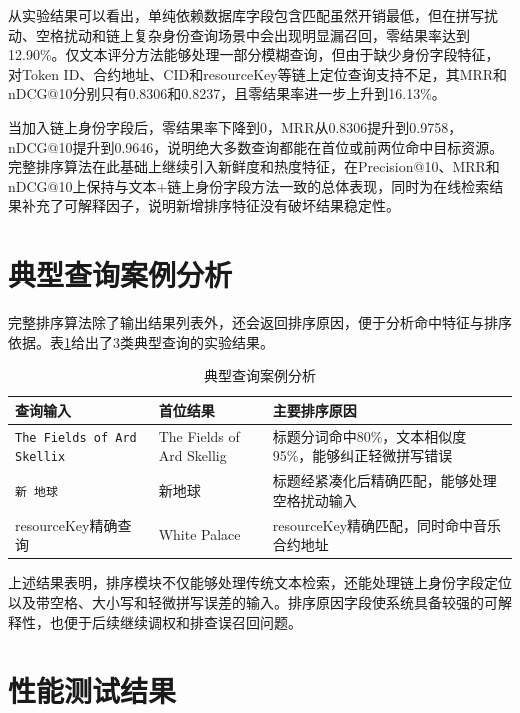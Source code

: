从实验结果可以看出，单纯依赖数据库字段包含匹配虽然开销最低，但在拼写扰动、空格扰动和链上复杂身份查询场景中会出现明显漏召回，零结果率达到12.90\%。仅文本评分方法能够处理一部分模糊查询，但由于缺少身份字段特征，对Token ID、合约地址、CID和resourceKey等链上定位查询支持不足，其MRR和nDCG@10分别只有0.8306和0.8237，且零结果率进一步上升到16.13\%。

当加入链上身份字段后，零结果率下降到0，MRR从0.8306提升到0.9758，nDCG@10提升到0.9646，说明绝大多数查询都能在首位或前两位命中目标资源。完整排序算法在此基础上继续引入新鲜度和热度特征，在Precision@10、MRR和nDCG@10上保持与文本+链上身份字段方法一致的总体表现，同时为在线检索结果补充了可解释因子，说明新增排序特征没有破坏结果稳定性。


\section{典型查询案例分析}

完整排序算法除了输出结果列表外，还会返回排序原因，便于分析命中特征与排序依据。表\ref{tab:ranking_case_analysis}给出了3类典型查询的实验结果。

\begin{table}[htbp]
    \linespread{1.45}
    \songti
    \centering
    \caption{典型查询案例分析}\label{tab:ranking_case_analysis}
    \begin{tabular}{|p{3.6cm}|p{3.6cm}|p{5.2cm}|}
        \hline
        查询输入                               & 首位结果                      & 主要排序原因                          \\ \hline
        \texttt{The Fields of Ard Skellix} & The Fields of Ard Skellig & 标题分词命中80\%，文本相似度95\%，能够纠正轻微拼写错误 \\ \hline
        \texttt{新 地球}                      & 新地球                       & 标题经紧凑化后精确匹配，能够处理空格扰动输入          \\ \hline
        resourceKey精确查询                    & White Palace              & resourceKey精确匹配，同时命中音乐合约地址      \\ \hline
    \end{tabular}
\end{table}

上述结果表明，排序模块不仅能够处理传统文本检索，还能处理链上身份字段定位以及带空格、大小写和轻微拼写误差的输入。排序原因字段使系统具备较强的可解释性，也便于后续继续调权和排查误召回问题。


\section{性能测试结果}

